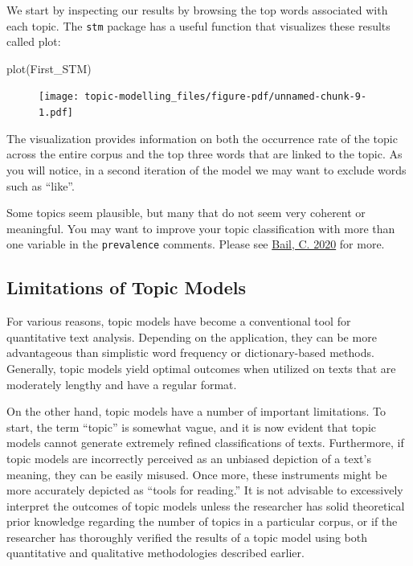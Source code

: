 \documentclass[
  letterpaper,
  DIV=11,
  numbers=noendperiod]{scrreprt}
\newenvironment{Shaded}{\begin{snugshade}}{\end{snugshade}}
\newcommand{\FunctionTok}[1]{\textcolor[rgb]{0.28,0.35,0.67}{#1}}
\newcommand{\NormalTok}[1]{\textcolor[rgb]{0.00,0.23,0.31}{#1}}
\begin{document}
We start by inspecting our results by browsing the top words associated
with each topic. The \texttt{stm} package has a useful function that
visualizes these results called plot:

\begin{Shaded}
\begin{Highlighting}[]
\FunctionTok{plot}\NormalTok{(First\_STM)}
\end{Highlighting}
\end{Shaded}

\begin{figure}[H]

{\centering \texttt{[image: topic-modelling\_files/figure-pdf/unnamed-chunk-9-1.pdf]}

}

\end{figure}

The visualization provides information on both the occurrence rate of
the topic across the entire corpus and the top three words that are
linked to the topic. As you will notice, in a second iteration of the
model we may want to exclude words such as ``like''.

Some topics seem plausible, but many that do not seem very coherent or
meaningful. You may want to improve your topic classification with more
than one variable in the \texttt{prevalence} comments. Please see
\href{https://sicss.io/2020/materials/day3-text-analysis/topic-modeling/rmarkdown/Topic_Modeling.html}{Bail,
C. 2020} for more.

\hypertarget{limitations-of-topic-models}{%
\subsection{Limitations of Topic
Models}\label{limitations-of-topic-models}}

For various reasons, topic models have become a conventional tool for
quantitative text analysis. Depending on the application, they can be
more advantageous than simplistic word frequency or dictionary-based
methods. Generally, topic models yield optimal outcomes when utilized on
texts that are moderately lengthy and have a regular format.

On the other hand, topic models have a number of important limitations.
To start, the term ``topic'' is somewhat vague, and it is now evident
that topic models cannot generate extremely refined classifications of
texts. Furthermore, if topic models are incorrectly perceived as an
unbiased depiction of a text's meaning, they can be easily misused. Once
more, these instruments might be more accurately depicted as ``tools for
reading.'' It is not advisable to excessively interpret the outcomes of
topic models unless the researcher has solid theoretical prior knowledge
regarding the number of topics in a particular corpus, or if the
researcher has thoroughly verified the results of a topic model using
both quantitative and qualitative methodologies described earlier.
\end{document}
